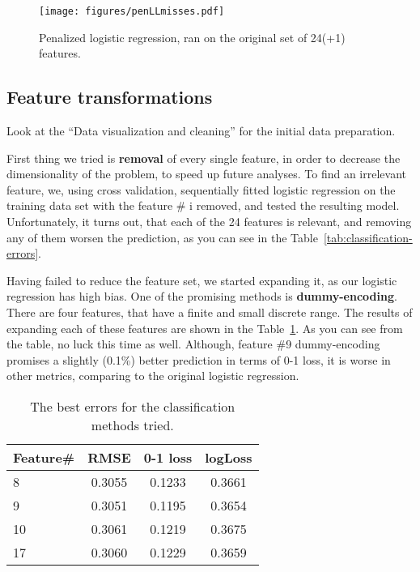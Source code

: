 \documentclass{article} %
\begin{document}
\begin{figure}[h]
\center
\texttt{[image: figures/penLLmisses.pdf]}
\caption{Penalized logistic regression, ran on the original set of 24(+1) features.}
\label{fig:penLLmisses}
\end{figure}

\subsection{Feature transformations}
Look at the ``Data visualization and cleaning'' for the initial data preparation.

First thing we tried is {\bf removal} of every single feature, in order to decrease the dimensionality of the problem, to speed up future analyses. To find an irrelevant feature, we, using cross validation, sequentially fitted logistic regression on the training data set with the feature \# i removed, and tested the resulting model. Unfortunately, it turns out, that each of the 24 features is relevant, and removing any of them worsen the prediction, as you can see in the Table~\ref{tab:classification-errors}.

Having failed to reduce the feature set, we started expanding it, as our logistic regression has high bias. One of the promising methods is {\bf dummy-encoding}. There are four features, that have a finite and small discrete range. The results of expanding each of these features are shown in the Table~\ref{tab:classification-dummy}. As you can see from the table, no luck this time as well. Although, feature \#9 dummy-encoding promises a slightly (0.1\%) better prediction in terms of 0-1 loss, it is worse in other metrics, comparing to the original logistic regression.
\begin{table}[h]
  \begin{center}
    \begin{tabular}{l|ccc}
      Feature\# & RMSE & 0-1 loss & logLoss \\
      \hline
      8 & 0.3055 & 0.1233 & 0.3661 \\
      9 & 0.3051 & 0.1195 & 0.3654 \\
      10 & 0.3061 & 0.1219 & 0.3675 \\
      17 & 0.3060 & 0.1229 & 0.3659
    \end{tabular}
    \caption{The best errors for the classification methods tried.}
    \label{tab:classification-dummy}
  \end{center}
\end{table}
\end{document}

